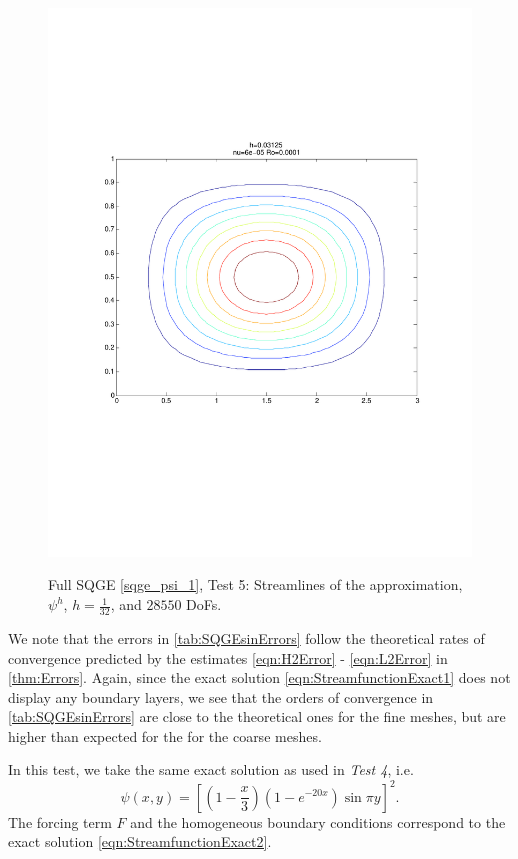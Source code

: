 \begin{figure}[H]
  \begin{center}
    \includegraphics[trim=0 200 20 215, clip=true, scale=0.5]{SQGEsin.pdf}
    \label{fig:SQGEsin}
    \caption{Full SQGE \eqref{sqge_psi_1}, Test 5: Streamlines of the approximation,
    $\psi^h$, $h=\frac{1}{32}$, and $28550$ DoFs.}
  \end{center}
\end{figure}

We note that the errors in \autoref{tab:SQGEsinErrors} follow the theoretical rates of convergence
predicted by the estimates \eqref{eqn:H2Error} - \eqref{eqn:L2Error} in \autoref{thm:Errors}. Again,
since the exact solution \eqref{eqn:StreamfunctionExact1} does not display any boundary layers, we
see that the orders of convergence in \autoref{tab:SQGEsinErrors} are close to the theoretical ones for the fine meshes, but are higher
than expected for the for the coarse meshes. 

In this test, we take the same exact solution as used in \emph{Test 4}, i.e.
\begin{equation}
  \psi(x,y) = \left[\left(1 - \frac{x}{3}\right)\left(1-e^{-20x}\right) \sin \pi y\right]^2.
  \label{eqn:StreamfunctionExact2}
\end{equation}
The forcing term $F$ and the homogeneous boundary conditions correspond to the exact solution
\eqref{eqn:StreamfunctionExact2}. 

